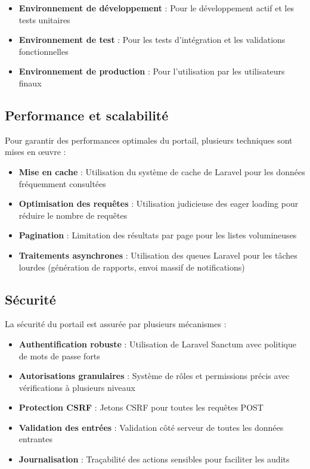 \begin{itemize}
    \item \textbf{Environnement de développement} : Pour le développement actif et les tests unitaires
    \item \textbf{Environnement de test} : Pour les tests d'intégration et les validations fonctionnelles
    \item \textbf{Environnement de production} : Pour l'utilisation par les utilisateurs finaux
\end{itemize}

\subsection{Performance et scalabilité}
Pour garantir des performances optimales du portail, plusieurs techniques sont mises en œuvre :

\begin{itemize}
    \item \textbf{Mise en cache} : Utilisation du système de cache de Laravel pour les données fréquemment consultées
    \item \textbf{Optimisation des requêtes} : Utilisation judicieuse des eager loading pour réduire le nombre de requêtes
    \item \textbf{Pagination} : Limitation des résultats par page pour les listes volumineuses
    \item \textbf{Traitements asynchrones} : Utilisation des queues Laravel pour les tâches lourdes (génération de rapports, envoi massif de notifications)
\end{itemize}

\subsection{Sécurité}
La sécurité du portail est assurée par plusieurs mécanismes :

\begin{itemize}
    \item \textbf{Authentification robuste} : Utilisation de Laravel Sanctum avec politique de mots de passe forts
    \item \textbf{Autorisations granulaires} : Système de rôles et permissions précis avec vérifications à plusieurs niveaux
    \item \textbf{Protection CSRF} : Jetons CSRF pour toutes les requêtes POST
    \item \textbf{Validation des entrées} : Validation côté serveur de toutes les données entrantes
    \item \textbf{Journalisation} : Traçabilité des actions sensibles pour faciliter les audits
\end{itemize}

